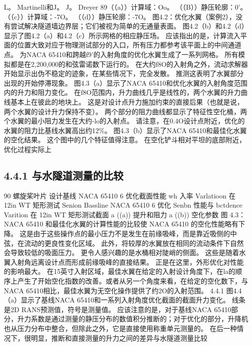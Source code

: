 \documentclass[UTF8,11pt,a4paper,openany,fontset=fandol]{ctexbook}
\begin{document}
L。 Martinelli和J。 J。 Dreyer 89（（a））计算域：Oo。 （（B））静压轮廓：0'。 （（c））计算域：-7O。 （（d））静压轮廓：-7O。 图4.2：优化水翼（案例2），没有尝试解决隧道墙边界层；它们被视为简单的无通量表面。 图4.2（b）和4.2（d）显示了图4.2（a）和4.2（c）所示网格的相应静压场。 应该指出的是，计算流入平面的位置大致对应于物理测试部分的入口，所有压力都参考该平面上的中间通道点。 为NACA 65410和跨越f9'的入射角度的优化水翼生成了一系列网格。 所有模拟都是在2,200,000的和弦雷诺数下运行的。 在大约f8O的入射角之外，流动求解器开始显示出伪不稳定的迹象，在某些情况下，完全发散。 推测这表明了水翼部分出现的开始停滞现象。 图4.3（a）显示了NACA 65410和优化水翼的入射角度范围内的升力和阻力变化。 在f8O范围内，升力曲线几乎是线性的，两个水翼的升力曲线基本上在彼此的地块上。 这是对设计点升力施加约束的直接后果（也就是说，两个水翼的设计升力保持不变）。 两个部分的阻力曲线都显示了特征性空化桶，两个水翼的最小阻力发生在大约-lo的入射点。 请注意，在0.4O设计点附近，优化的水翼的阻力比基线水翼高出约12\%。 图4.3（b）显示了NACA 65410和最佳化水翼的空化结果。 这个图中的几个特征值得注意。 在空化铲斗相对平坦的底部附近，优化过程实际上

\subsection{4.4.1 与水隧道测量的比较}
90 螺旋桨叶片 设计基线 NACA 65410 6 优化截面性能 wh 入率 Varlatioon 在 12in WT 矩形测试 Senion Bassline NACA 65410 6 优化 Senbn 性能与 bctdence Varition 在 12in WT 矩形测试截面 a ((a)) 提升和阻力 a ((b)) 空化参数 图 4.3：NACA 65410 和最佳化水翼的计算性能的比较使 NACA 65410 的空化性能略有下降。 这是由于这些操作点的最小压力不是发生在前缘吸峰，而是靠近吸侧的中弦，在流动的更良性变化区域。 此外，将较厚的水翼放在相同的流动条件下自然会导致较低的吸面压力。 更令人感兴趣的是水桶相对陡峭的侧面。 这些是随着水翼入射角远离设计点而形成前缘吸峰的直接结果。 正是在这里，外形优化对性能的影响最大。 在15英寸入射区域，最佳水翼在给定的入射设计角度下，在la的顺序上产生了开始空化指数的改善。或者从另一个角度来看，在给定的空化数下，与NACA 65410相比，最佳水翼为无空化操作提供了约2O的入射范围。 4.4.1 图4.4（a）显示了基线NACA 65410和一系列入射角度优化截面的截面升力变化。 线条是2D RANS预测值，符号是测量值。 应该注意的是，对于基线NACA 65410部分，升力系数是通过测量的静压分布的数值积分推断的；对于优化的部分，升降机也从压力分布中整合，但除此之外，它是直接使用称重单元测量的。 在后一种情况下，很明显，推断和直接测量的升力之间的差异与水隧道测量比较
\end{document}
